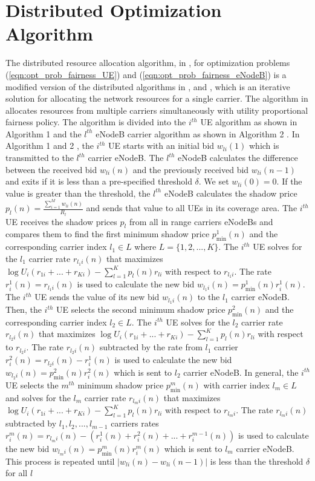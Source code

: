 \documentclass[journal]{IEEEtran} 		\usepackage{amsmath,amssymb}
\begin{document}
\section{Distributed Optimization Algorithm}\label{sec:Algorithm}

The distributed resource allocation algorithm, in \cite{Ahmed_Utility4}, for optimization problems (\ref{eqn:opt_prob_fairness_UE}) and (\ref{eqn:opt_prob_fairness_eNodeB}) is a modified version of the distributed algorithms in \cite{Ahmed_Utility1, Ahmed_Utility2,Ahmed_Utility3}, \cite{kelly98ratecontrol} and \cite{Low99optimizationflow}, which is an iterative solution for allocating the network resources for a single carrier. The algorithm in \cite{Ahmed_Utility4} allocates resources from multiple carriers simultaneously with utility proportional fairness policy. The algorithm is divided into the $i^{th}$ UE algorithm as shown in Algorithm 1 \cite{Ahmed_Utility4} and the $l^{th}$ eNodeB carrier algorithm as shown in Algorithm 2 \cite{Ahmed_Utility4}. In Algorithm 1 and 2 \cite{Ahmed_Utility4}, the $i^{th}$ UE starts with an initial bid $w_{li}(1)$ which is transmitted to the $l^{th}$ carrier eNodeB. The $l^{th}$ eNodeB calculates the difference between the received bid $w_{li}(n)$ and the previously
received bid $w_{li}(n-1)$ and exits if it is less than a pre-specified threshold $\delta$. We set $w_{li}(0) = 0$. If the value is greater than the threshold, the $l^{th}$ eNodeB calculates the shadow price $p_l(n) = \frac{\sum_{i=1}^{M}w_{li}(n)}{R_l}$ and sends that value to all UEs in its coverage area. The $i^{th}$ UE receives the shadow prices $p_{l}$ from all in range carriers eNodeBs and compares them to find the first minimum shadow price $p_{\min}^{1}(n)$ and the corresponding carrier index $l_1 \in L$ where $L = \{1, 2, ..., K\}$. The $i^{th}$ UE solves for the $l_1$ carrier rate $r_{l_1i}(n)$ that maximizes $\log U_i(r_{1i}+...+r_{Ki}) - \sum_{l=1}^{K}p_l(n)r_{li}$ with respect to $r_{l_1i}$. The rate $r_{i}^{1}(n) = r_{l_1i}(n)$ is used to calculate the new bid $w_{l_1i}(n)=p_{\min}^{1}(n) r_{i}^{1}(n)$. The $i^{th}$ UE sends the value of its new bid $w_{l_1i}(n)$ to the $l_1$ carrier eNodeB. Then, the $i^{th}$ UE selects the second minimum shadow price  $p_{\min}^{2}(n)$ and the corresponding
carrier index $l_2 \in L$. The $i^{th}$ UE solves
for the $l_2$ carrier rate $r_{l_2i}(n)$ that maximizes $\log U_i(r_{1i}+...+r_{Ki}) - \sum_{l=1}^{K}p_l(n)r_{li}$ with respect to $r_{l_2i}$. The rate $r_{l_2i}(n)$ subtracted by the rate from $l_1$ carrier $r_{i}^{2}(n) = r_{l_2i}(n) - r_{i}^{1}(n)$ is used to calculate the new bid $w_{l_2i}(n)=p_{\min}^{2}(n) r_{i}^{2}(n)$ which is sent to $l_2$ carrier eNodeB. In general, the $i^{th}$ UE selects the $m^{th}$  minimum shadow price $p_{\min}^{m}(n)$ with carrier index $l_m \in L$ and solves for the $l_m$ carrier rate $r_{l_mi}(n)$ that maximizes $\log U_i(r_{1i}+...+r_{Ki}) - \sum_{l=1}^{K}p_l(n)r_{li}$ with respect to $r_{l_mi}$. The rate $r_{l_mi}(n)$ subtracted by $l_1, l_2, ..., l_{m-1}$ carriers rates  $r_{i}^{m}(n) = r_{l_mi}(n) - (r_{i}^{1}(n)+r_{i}^{2}(n)+...+r_{i}^{m-1}(n))$ is used to calculate the new bid $w_{l_mi}(n)=p_{\min}^{m}(n) r_{i}^{m}(n)$ which is sent to $l_m$ carrier eNodeB. This process is repeated until $|w_{li}(n) -w_{li}(n-1)|$ is less than the threshold $\delta$ for all $l$
\end{document}

